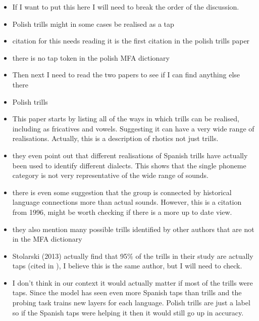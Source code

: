 \iffalse
\begin{itemize}
    \item If I want to put this here I will need to break the order of the discussion.
    \item Polish trills might in some cases be realised as a tap \cite{}
    \item citation for this needs reading it is the first citation in the polish trills paper
    \item there is no tap token in the polish MFA dictionary
    \item Then next I need to read the two papers to see if I can find anything else there
    \item Polish trills \cite{stolarski2015further}
    \item This paper starts by listing all of the ways in which trills can be realised, including as fricatives and vowels. Suggesting it can have a very wide range of realisations. Actually, this is a description of rhotics not just trills.
    \item they even point out that different realisations of Spanish trills have actually been used to identify different dialects. This shows that the single phoneme category is not very representative of the wide range of sounds.
    \item there is even some suggestion that the group is connected by historical language connections more than actual sounds. However, this is a citation from 1996, might be worth checking if there is a more up to date view.
    \item they also mention many possible trills identified by other authors that are not in the MFA dictionary
    \item Stolarski (2013) actually find that 95\% of the trills in their study are actually taps (cited in \cite{stolarski2015further}), I believe this is the same author, but I will need to check.
    \item I don't think in our context it would actually matter if most of the trills were taps. Since the model has seen even more Spanish taps than trills and the probing task trains new layers for each language. Polish trills are just a label so if the Spanish taps were helping it then it would still go up in accuracy.
    

\end{itemize}
